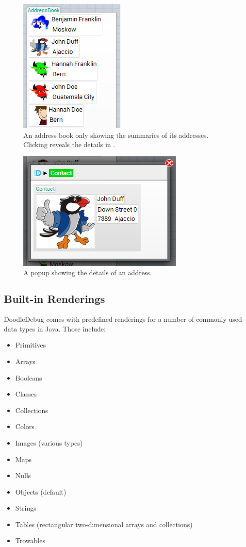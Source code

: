 \documentclass[english]{scrartcl}
\newcommand{\DD}{Dood\-le\-De\-bug\xspace}
\begin{document}
\begin{figure}[h]
	\includegraphics{img/AddressBook_whole.png}
	\caption[AddressBook visualization]{An address book only showing the summaries of its addresses. Clicking reveals the details in .}
\end{figure}

\begin{figure}[h]
	\includegraphics{img/AddressBook_contact.png}
	\caption[Contact visualization]{A popup showing the details of an address.}
\end{figure}

\subsection{Built-in Renderings}
\DD comes with predefined renderings for a number of commonly used data types in Java.
Those include:
\begin{itemize}[noitemsep]
\item Primitives
\item Arrays
\item Booleans
\item Classes
\item Collections
\item Colors
\item Images (various types)
\item Maps
\item Nulls
\item Objects (default)
\item Strings
\item Tables (rectangular two-dimensional arrays and collections)
\item Trowables
\end{itemize}
\end{document}
